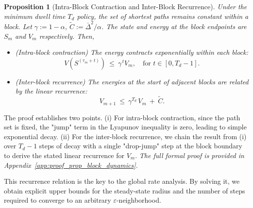 \documentclass[journal]{IEEEtran}
\newtheorem{proposition}{Proposition}
\begin{document}
\begin{proposition}[Intra-Block Contraction and Inter-Block Recurrence]
\label{prop:block_dynamics}
Under the minimum dwell time $T_d$ policy, the set of shortest paths remains constant within a block. Let $\gamma:=1-\alpha$, $\tilde C:=\bar\Delta^2/\alpha$. The state and energy at the block endpoints are $S_m$ and $V_m$ respectively. Then,
\begin{itemize}
    \item[\textit{(i)}] (Intra-block contraction) The energy contracts exponentially within each block:
    \begin{equation}\label{eq:intra_block}
    V(S^{(\tau_m+t)})\ \le\ \gamma^{\,t}V_m, \quad \text{for } t \in [0, T_d-1].
    \end{equation}
    \item[\textit{(ii)}] (Inter-block recurrence) The energies at the start of adjacent blocks are related by the linear recurrence:
    \begin{equation}\label{eq:inter_block}
    V_{m+1}\ \le\ \gamma^{T_d}\,V_m\ +\ \tilde C.
    \end{equation}
\end{itemize}
\end{proposition}
\begin{IEEEproof}
The proof establishes two points. (i) For intra-block contraction, since the path set is fixed, the "jump" term in the Lyapunov inequality is zero, leading to simple exponential decay. (ii) For the inter-block recurrence, we chain the result from (i) over $T_d-1$ steps of decay with a single "drop-jump" step at the block boundary to derive the stated linear recurrence for $V_m$.
\textit{The full formal proof is provided in Appendix~\ref{app:proof_prop_block_dynamics}.}
\end{IEEEproof}

This recurrence relation is the key to the global rate analysis. By solving it, we obtain explicit upper bounds for the steady-state radius and the number of steps required to converge to an arbitrary $\varepsilon$-neighborhood.
\end{document}
